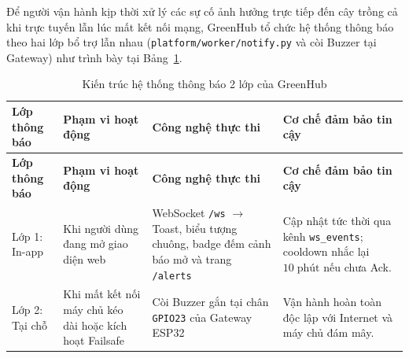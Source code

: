 \endgroup

Để người vận hành kịp thời xử lý các sự cố ảnh hưởng trực tiếp đến cây trồng cả khi trực tuyến lẫn lúc mất kết nối mạng, GreenHub tổ chức hệ thống thông báo theo hai lớp bổ trợ lẫn nhau (\texttt{platform/worker/notify.py} và còi Buzzer tại Gateway) như trình bày tại Bảng~\ref{tab:notify-2-layers}.

\begingroup
\footnotesize
\setlength{\tabcolsep}{3.5pt}
\renewcommand{\arraystretch}{1.12}
\begin{longtable}{|>{\raggedright\arraybackslash}p{}|>{\raggedright\arraybackslash}p{}|>{\raggedright\arraybackslash}p{}|>{\raggedright\arraybackslash}p{}|}
\caption{Kiến trúc hệ thống thông báo 2 lớp của GreenHub}\label{tab:notify-2-layers}\\
\hline
\textbf{Lớp thông báo} & \textbf{Phạm vi hoạt động} & \textbf{Công nghệ thực thi} & \textbf{Cơ chế đảm bảo tin cậy} \\
\hline
\endfirsthead
\hline
\textbf{Lớp thông báo} & \textbf{Phạm vi hoạt động} & \textbf{Công nghệ thực thi} & \textbf{Cơ chế đảm bảo tin cậy} \\
\hline
\endhead
Lớp 1: In-app & Khi người dùng đang mở giao diện web & WebSocket \texttt{/ws} \(\rightarrow\) Toast, biểu tượng chuông, badge đếm cảnh báo mở và trang \texttt{/alerts} & Cập nhật tức thời qua kênh \texttt{ws\_events}; cooldown nhắc lại \(10\;\text{phút}\) nếu chưa Ack. \\ \hline
Lớp 2: Tại chỗ & Khi mất kết nối máy chủ kéo dài hoặc kích hoạt Failsafe & Còi Buzzer gắn tại chân \texttt{GPIO23} của Gateway ESP32 & Vận hành hoàn toàn độc lập với Internet và máy chủ đám mây. \\ \hline
\end{longtable}
\endgroup

\setcounter{secnumdepth}{2}
